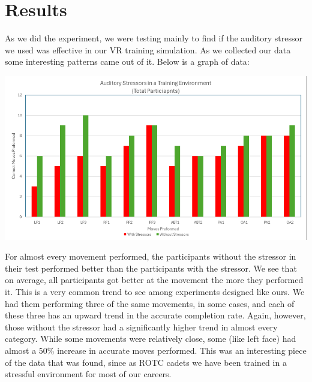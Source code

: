 \documentclass[manuscript,screen,review]{acmart}
\begin{document}

\section{Results}
As we did the experiment, we were testing mainly to find if the auditory stressor we used was effective in our 
VR training simulation. As we collected our data some interesting patterns came out of it. Below is a graph of data: 

\includegraphics[scale=0.8]{MainGraph}

For almost every movement performed, the participants without the stressor in their test performed better than the 
participants with the stressor. We see that on average, all participants got better at the movement the more they 
performed it. This is a very common trend to see among experiments designed like ours. We had them performing 
three of the same movements, in some cases, and each of these three has an upward trend in the accurate completion 
rate. Again, however, those without the stressor had a significantly higher trend in almost every category. While 
some movements were relatively close, some (like left face) had almost a 50\% increase 
in accurate moves performed. This was an interesting piece of the data that was found, since as ROTC cadets we have 
been trained in a stressful environment for most of our careers.  
\end{document}
